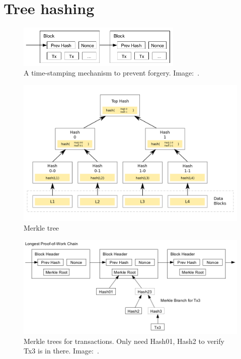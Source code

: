 \section{Tree hashing}

\begin{frame}
  \begin{figure}
    \includegraphics[width=0.7\textwidth]{fig/bitcoin-pow.png}
    \caption{A time-stamping mechanism to prevent forgery.
    Image:~\cite{Nakamoto2008bap}.}
  \end{figure}
\end{frame}

\begin{frame}
  \begin{figure}
    \includegraphics[width=0.9\columnwidth]{fig/merkle-tree.png}
    \caption{Merkle tree}
  \end{figure}
\end{frame}

\begin{frame}
  \begin{figure}
    \includegraphics[width=\textwidth]{fig/bitcoin-powchain.png}
    \caption{Merkle trees for transactions.
      Only need Hash01, Hash2 to verify Tx3 is in there.
    Image:~\cite{Nakamoto2008bap}.}
  \end{figure}
\end{frame}

